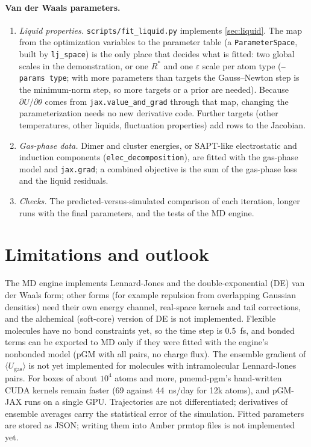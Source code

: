 \documentclass[11pt]{article}
\newcommand{\code}[1]{\texttt{#1}}
\begin{document}
\paragraph{Van der Waals parameters.}
\begin{enumerate}[nosep,leftmargin=*]
\item \emph{Liquid properties.} \code{scripts/fit\_liquid.py} implements \cref{sec:liquid}. The map
from the optimization variables to the parameter table (a \code{ParameterSpace}, built by \code{lj\_space}) is the only place that
decides what is fitted: two global scales in the demonstration, or one $R^*$ and one $\varepsilon$
scale per atom type (\code{--params type}; with more parameters than targets the Gauss--Newton step
is the minimum-norm step, so more targets or a prior are needed). Because $\partial U/\partial\theta$ comes from \code{jax.value\_and\_grad}
through that map, changing the parameterization needs no new derivative code. Further targets
(other temperatures, other liquids, fluctuation properties) add rows to the Jacobian.
\item \emph{Gas-phase data.} Dimer and cluster energies, or SAPT-like electrostatic and induction
components (\code{elec\_decomposition}), are fitted with the gas-phase model and
\code{jax.grad}; a combined objective is the sum of the gas-phase loss and the liquid residuals.
\item \emph{Checks.} The predicted-versus-simulated comparison of each iteration, longer runs with
the final parameters, and the tests of the MD engine.
\end{enumerate}


\section{Limitations and outlook}
The MD engine implements Lennard-Jones and the double-exponential (DE) van der Waals form; other forms (for
example repulsion from overlapping Gaussian densities) need their own energy channel, real-space kernels and tail
corrections, and the alchemical (soft-core) version of DE is not implemented. Flexible molecules have no bond constraints yet, so the time step is 0.5~fs, and
bonded terms can be exported to MD only if they were fitted with the engine's nonbonded model
(pGM with all pairs, no charge flux). The ensemble gradient of $\langle U_\mathrm{gas}\rangle$ is not
yet implemented for molecules with intramolecular Lennard-Jones pairs. For boxes of about
$10^4$ atoms and more, pmemd-pgm's hand-written CUDA kernels remain faster (69 against 44~ns/day for
12k atoms), and pGM-JAX runs on a single GPU. Trajectories are not differentiated; derivatives of
ensemble averages carry the statistical error of the simulation. Fitted parameters are stored as
JSON; writing them into Amber prmtop files is not implemented yet.
\end{document}
